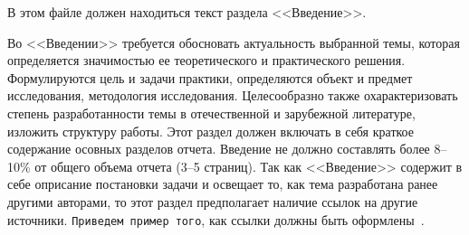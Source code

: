\intro
В этом файле должен находиться текст раздела <<Введение>>. 


Во <<Введении>>  требуется обосновать актуальность выбранной темы, которая
определяется значимостью ее теоретического и практического решения.
Формулируются цель и задачи практики, определяются объект и предмет
исследования, методология исследования. Целесообразно также охарактеризовать
степень разработанности темы в отечественной и зарубежной литературе,
изложить структуру работы. Этот раздел должен включать в себя краткое
содержание осовных разделов отчета. Введение не должно составлять более 8--10\%
от общего объема отчета (3--5 страниц). Так как <<Введение>> содержит в себе
оприсание постановки задачи и освещает то, как тема разработана ранее другими
авторами, то этот раздел предполагает наличие ссылок на другие источники.
\texttt{Приведем пример того}, как ссылки должны быть
оформлены~\cite{CitekeyArticle, Boreskov2010}.


